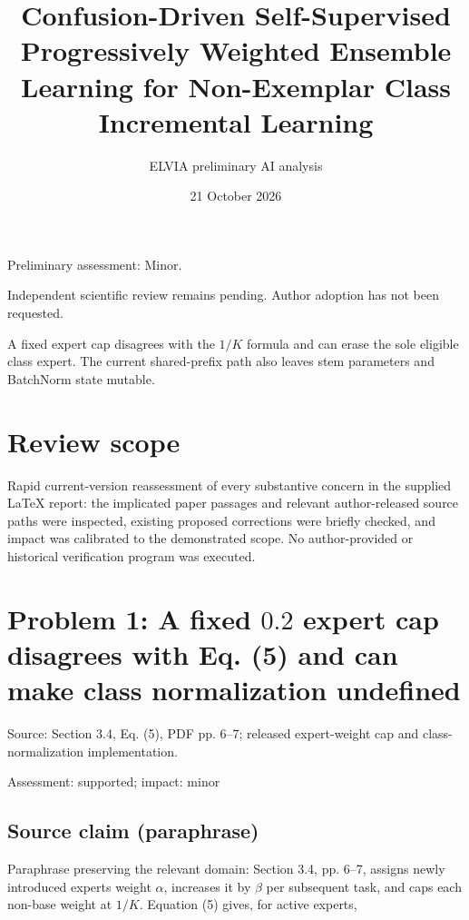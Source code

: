 \documentclass[11pt]{article}
\begin{document}
\title{Confusion-Driven Self-Supervised Progressively Weighted Ensemble Learning for Non-Exemplar Class Incremental Learning}

\author{ELVIA preliminary AI analysis}\date{21 October 2026}\maketitle

Preliminary assessment: Minor.\par

Independent scientific review remains pending. Author adoption has not been requested.

A fixed expert cap disagrees with the \(1/K\) formula and can erase the sole eligible class expert. The current shared-prefix path also leaves stem parameters and BatchNorm state mutable.

\section*{Review scope}

Rapid current-version reassessment of every substantive concern in the supplied LaTeX report: the implicated paper passages and relevant author-released source paths were inspected, existing proposed corrections were briefly checked, and impact was calibrated to the demonstrated scope. No author-provided or historical verification program was executed.

\section*{Problem 1: A fixed \(0.2\) expert cap disagrees with Eq. (5) and can make class normalization undefined}

Source: Section 3.4, Eq. (5), PDF pp. 6–7; released expert-weight cap and class-normalization implementation.

Assessment: supported; impact: minor

\subsection*{Source claim (paraphrase)}

Paraphrase preserving the relevant domain: Section 3.4, pp. 6–7, assigns newly introduced experts weight \(\alpha\), increases it by \(\beta\) per subsequent task, and caps each non-base weight at \(1/K\). Equation (5) gives, for active experts,
\end{document}
